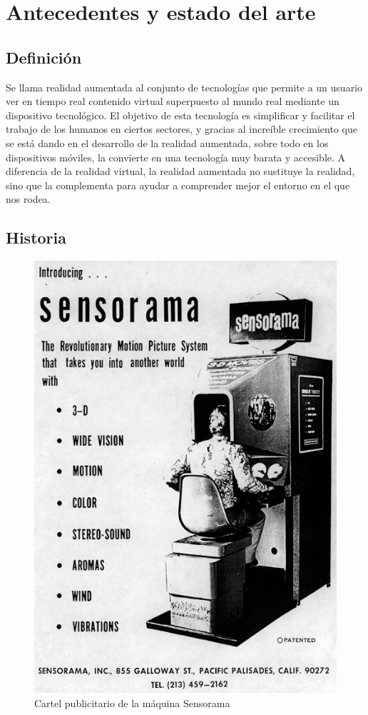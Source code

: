 \chapter{Antecedentes y estado del arte}\label{Antecedentes}
\section{Definición}
Se llama realidad aumentada al conjunto de tecnologías que permite a un usuario ver en tiempo real contenido virtual superpuesto al mundo real mediante un dispositivo tecnológico. El objetivo de esta tecnología es simplificar y facilitar el trabajo de los humanos en ciertos sectores, y gracias al increíble crecimiento que se está dando en el desarrollo de la realidad aumentada, sobre todo en los dispositivos móviles, la convierte en una tecnología muy barata y accesible. A diferencia de la realidad virtual, la realidad aumentada no sustituye la realidad, sino que la complementa para ayudar a comprender mejor el entorno en el que nos rodea.

\section{Historia}
\begin{figure}
    \centering
    \includegraphics{Images/Sensorama.png}
    \caption{Cartel publicitario de la máquina Sensorama}
    \label{fig:Sensorama}
\end{figure}


